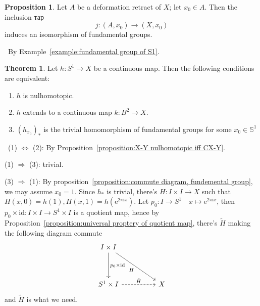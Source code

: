 \documentclass[12pt,a4paper]{book}
\newenvironment{prooff}{{\noindent\it\textcolor{cyan!40!black}{Proof}:}\,}{\par}
\newcommand{\bb}[1]{\mathbb{#1}}
\theoremstyle{definition}
\newtheorem{theo}[defn]{Theorem}
\newtheorem{prop}[defn]{Proposition}
\begin{document}
\begin{prop}
    Let $A$ be a deformation retract of $X$; let $x_0 \in A$. Then the inclusion тар
    $$
        j:\left(A, x_0\right) \rightarrow\left(X, x_0\right)
    $$
    induces an isomorphism of fundamental groups.
\end{prop}
\begin{prooff}
    By Example~\ref{example:fundamental group of S1}.
\end{prooff}
\begin{theo}
    Let $h: S^1 \rightarrow X$ be a continuous map. Then the following conditions are equivalent:
    \begin{enumerate}[(1)]
        \item $h$ is nulhomotopic.
        \item $h$ extends to a continuous map $k: B^2 \rightarrow X$.
        \item $(h_{x_0})_*$ is the trivial homomorphism of fundamental groups for some $x_0\in \bb{S}^1$
    \end{enumerate}
\end{theo}
\begin{prooff}
    (1) $\Leftrightarrow$ (2): By Proposition~\ref{proposition:X-Y nulhomotopic iff CX-Y}.

    (1) $\Rightarrow$ (3): trivial.

    (3) $\Rightarrow$ (1): By proposition~\ref{proposition:commute diagram, fundemental group}, we may assume $x_0=1$.
    Since $h_*$ is trivial, there's $H:I\times I\rightarrow X$ such that $H(x,0)=h(1), H(x,1)=h(\text{e}^{2\pi \text{i}x})$.
    Let $p_0:I\rightarrow S^1 \quad x\mapsto \text{e}^{2\pi \text{i}x}$, then $p_0\times \text{id}:I\times I\rightarrow S^1 \times I$ is a quotient map,
    hence by Proposition~\ref{proposition:universal proptery of quotient map}, there's $\tilde{H}$ making the following diagram commute
    \[\begin{tikzcd}
            {I\times I} \\
            \\
            {S^1\times I} && X
            \arrow["{p_0\times \text{id}}", from=1-1, to=3-1]
            \arrow["H"', from=1-1, to=3-3]
            \arrow["{\tilde{H}}", dashed, from=3-1, to=3-3]
        \end{tikzcd}\]
    and $\tilde{H}$ is what we need.
\end{prooff}
\end{document}
